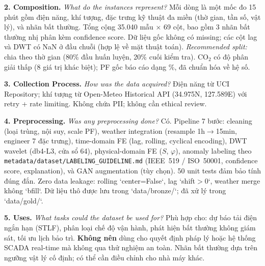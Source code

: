 \noindent\textbf{2. Composition.}
\textit{What do the instances represent?}
Mỗi dòng là một mốc đo 15 phút gồm điện năng, khí tượng, đặc trưng kỹ thuật đa miền (thờ gian, tần số, vật lý), và nhãn bất thường.
Tổng cộng 35.040 mẫu × 69 cột, bao gồm 3 nhãn bất thường nhị phân kèm confidence score.
Dữ liệu gốc không có missing; các cột lag và DWT có NaN ở đầu chuỗi (hợp lệ về mặt thuật toán).
\textit{Recommended split:} chia theo thờ gian (80\% đầu huấn luyện, 20\% cuối kiểm tra).
CO$_2$ có độ phân giải thấp (8 giá trị khác biệt); PF gốc báo cáo dạng \%, đã chuẩn hóa về hệ số.

\noindent\textbf{3. Collection Process.}
\textit{How was the data acquired?}
Điện năng từ UCI Repository; khí tượng từ Open-Meteo Historical API (34.975\textdegree{}N, 127.589\textdegree{}E) với retry + rate limiting.
Không chứa PII; không cần ethical review.

\noindent\textbf{4. Preprocessing.}
\textit{Was any preprocessing done?}
Có. Pipeline 7 bước: cleaning (loại trùng, nội suy, scale PF), weather integration (resample 1h$\rightarrow$15min, engineer 7 đặc trưng), time-domain FE (lag, rolling, cyclical encoding), DWT wavelet (db4-L3, cửa sổ 64), physical-domain FE ($S$, $\varphi$), anomaly labeling theo \texttt{metadata/dataset/LABELING\_GUIDELINE.md} (IEEE~519 / ISO~50001, confidence score, explanation), và GAN augmentation (tùy chọn).
50 unit tests đảm bảo tính đúng đắn.
Zero data leakage: rolling `center=False`, lag `shift$>$0`, weather merge không `bfill`.
Dữ liệu thô được lưu trong `data/bronze/`; đã xử lý trong `data/gold/`.

\noindent\textbf{5. Uses.}
\textit{What tasks could the dataset be used for?}
Phù hợp cho: dự báo tải điện ngắn hạn (STLF), phân loại chế độ vận hành, phát hiện bất thường không giám sát, tối ưu lịch bảo trì.
\textbf{Không nên} dùng cho quyết định pháp lý hoặc hệ thống SCADA real-time mà không qua thử nghiệm an toàn.
Nhãn bất thường dựa trên ngưỡng vật lý cố định; có thể cần điều chỉnh cho nhà máy khác.

